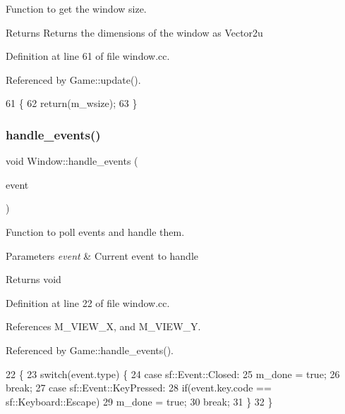 Function to get the window size. 

\begin{DoxyReturn}{Returns}
Returns the dimensions of the window as Vector2u 
\end{DoxyReturn}


Definition at line 61 of file window.\+cc.



Referenced by Game\+::update().


\begin{DoxyCode}
61                                    \{
62     \textcolor{keywordflow}{return}(m\_wsize);
63 \}
\end{DoxyCode}
\mbox{\label{class_window_ae7c221f904b304e507339e6e25ccd018}} 
\subsubsection{\texorpdfstring{handle\+\_\+events()}{handle\_events()}}
{\footnotesize\ttfamily void Window\+::handle\+\_\+events (\begin{DoxyParamCaption}\item[{sf\+::\+Event \&}]{event }\end{DoxyParamCaption})}



Function to poll events and handle them. 


\begin{DoxyParams}{Parameters}
{\em event} & Current event to handle \\
\hline
\end{DoxyParams}
\begin{DoxyReturn}{Returns}
void 
\end{DoxyReturn}


Definition at line 22 of file window.\+cc.



References M\+\_\+\+V\+I\+E\+W\+\_\+X, and M\+\_\+\+V\+I\+E\+W\+\_\+Y.



Referenced by Game\+::handle\+\_\+events().


\begin{DoxyCode}
22                                          \{
23     \textcolor{keywordflow}{switch}(event.type) \{
24         \textcolor{keywordflow}{case} sf::Event::Closed:
25             m\_done = \textcolor{keyword}{true};
26             \textcolor{keywordflow}{break};
27         \textcolor{keywordflow}{case} sf::Event::KeyPressed:
28             \textcolor{keywordflow}{if}(event.key.code == sf::Keyboard::Escape)
29                 m\_done = \textcolor{keyword}{true};
30             \textcolor{keywordflow}{break};
31     \}
32 \}
\end{DoxyCode}
\mbox{\label{class_window_ad8206b00f1fcb41deb97d34a58f10e14}} 

